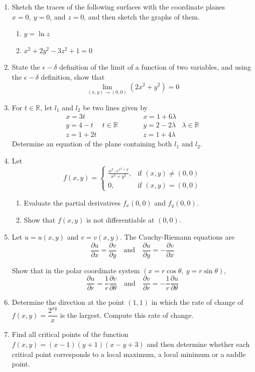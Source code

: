\documentclass[a4paper, 12pt]{article}
\begin{document}
\begin{enumerate}[leftmargin=*,label=\textbf{\arabic*.}]
\item Sketch the traces of the following surfaces with the coordinate planes $x=0,\:y=0$, and $z=0$, and then sketch the graphs of them.

\begin{enumerate}[leftmargin=*,label=\textbf{\alph*.}]
\item $y=\ln z$
\item $x^2+2y^2-3z^2+1=0$
\end{enumerate}

\item State the $\epsilon-\delta$ definition of the limit of a function of two variables, and using the $\epsilon-\delta$ definition, show that
\[\lim_{(x,y)\to(0,0)}\left(2x^2+y^2\right)=0\]

\item For $t\in\mathbb{R}$, let $l_1$ and $l_2$ be two lines given by
\[\begin{array}{ccccc}
x=3t&&&x=1+6\lambda&\\
y=4-t&t\in\mathbb{R}&& y=2-2\lambda&\lambda\in\mathbb{R}\\
z=1+2t&&\qquad&z=1+4\lambda&
\end{array}\]
Determine an equation of the plane containing both $l_1$ and $l_2$.

\item Let
\[f(x,y)=\left\{\begin{array}{cc}
\displaystyle\frac{x^2\cdot{e}^{x^2+y}}{x^2+y^2},&\text{if }(x,y)\neq(0,0)\\[1em]
0,&\text{if }(x,y)=(0,0)
\end{array}\right.\]

\begin{enumerate}[leftmargin=*,label=\textbf{\alph*.}]
\item Evaluate the partial derivatives $f_x(0,0)$ and $f_y(0,0)$.
\item Show that $f(x,y)$ is not differentiable at $(0,0)$.
\end{enumerate}

\item Let $u=u(x,y)$ and $v=v(x,y)$. The Cauchy-Riemann equations are
\[\frac{\partial u}{\partial x}=\frac{\partial v}{\partial y}\quad\text{and}\quad\frac{\partial u}{\partial y}=-\frac{\partial v}{\partial x}\]

Show that in the polar coordinate system $(x=r\cos\theta,\:y=r\sin\theta)$,
\[\frac{\partial u}{\partial r}=\frac1r\frac{\partial v}{\partial\theta}\quad\text{and}\quad\frac{\partial v}{\partial r}=-\frac1r\frac{\partial u}{\partial \theta}\]

\item Determine the direction at the point $(1,1)$ in which the rate of change of $f(x,y)=\dfrac{2^{xy}}x$ is the largest. Compute this rate of change.

\item Find all critical points of the function $f(x,y)=(x-1)(y+1)(x-y+3)$ and then determine whether each critical point corresponds to a local maximum, a local minimum or a saddle point.
\end{enumerate}
\end{document}
